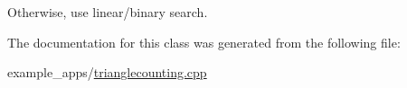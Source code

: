 \begin{DoxyVerb}                Otherwise, use linear/binary search.\end{DoxyVerb}


The documentation for this class was generated from the following file\-:\begin{DoxyCompactItemize}
\item 
example\-\_\-apps/\hyperlink{trianglecounting_8cpp}{trianglecounting.\-cpp}\end{DoxyCompactItemize}
